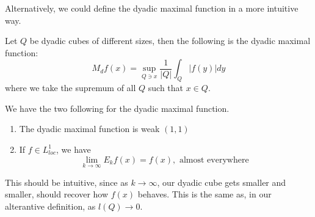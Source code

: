 Alternatively, we could define the dyadic maximal function in a more intuitive way.
\begin{definition}
    Let $Q$ be dyadic cubes of different sizes, then the following is the dyadic maximal function:
    \begin{equation*}
        M_df(x)=\sup_{Q\ni x}\frac{1}{|Q|}\int_Q|f(y)|dy
    \end{equation*}
    where we take the supremum of all $Q$ such that $x\in Q$.
\end{definition}

\begin{theorem}
    We have the two following for the dyadic maximal function.
    \begin{enumerate}
        \item The dyadic maximal function is weak $(1,1)$
        \item If $f\in L_{loc}^1$, we have
            \begin{equation*}
                \lim_{k\to\infty}E_kf(x)=f(x), \text{ almost everywhere }
            \end{equation*}
    \end{enumerate}
    This should be intuitive, since as $k\to\infty$, our dyadic cube gets smaller and smaller, should recover how $f(x)$ behaves. This is the same as, in our alterantive definition, as $l(Q)\to 0$.
\end{theorem}

